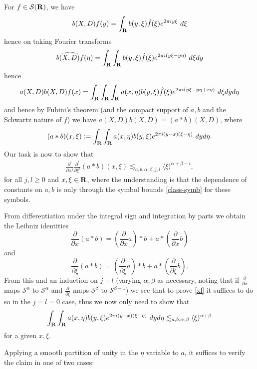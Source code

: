 \documentclass[11pt]{article}
\theoremstyle{definition}
\theoremstyle{remark}
\begin{document}
For \({f \in {\mathcal S}({\bf R})}\), we have 
\[\displaystyle  b(X,D) f(y) = \int_{\bf R} b(y,\xi) \hat f(\xi) e^{2\pi i y \xi}\ d\xi\]
 hence on taking Fourier transforms 
\[\displaystyle  \widehat{b(X,D) f}(\eta) = \int_{\bf R} \int_{\bf R} b(y,\xi) \hat f(\xi) e^{2\pi i (y \xi- y\eta)}\ d\xi dy\]
 hence 
\[\displaystyle  a(X,D) b(X,D) f(x) = \int_{\bf R} \int_{\bf R} \int_{\bf R} a(x,\eta) b(y,\xi) \hat f(\xi) e^{2\pi i (y \xi-y\eta + x \eta)}\ d\xi dy d\eta\]
 and hence by Fubini’s theorem (and the compact support of \({a,b}\) and the Schwartz nature of \({f}\)) we have \({a(X,D) b(X,D) = (a \ast b)(X,D)}\), where 
\begin{align}\label{ast-def}
  (a \ast b)(x,\xi) := \int_{\bf R} \int_{\bf R} a(x,\eta) b(y,\xi) e^{2\pi i (y-x)(\xi-\eta)}\ dy d\eta. 
\end{align}
 Our task is now to show that 
\begin{align}\label{xl}
  \frac{\partial^j}{\partial x^j} \frac{\partial^l}{\partial \xi^l} (a \ast b)(x,\xi) \lesssim_{a,b,\alpha,\beta,j,l} \langle \xi \rangle^{\alpha+\beta-l}, 
\end{align}
 for all \({j,l \geq 0}\) and \({x,\xi \in {\bf R}}\), where the understanding is that the dependence of constants on \({a,b}\) is only through the symbol bounds \eqref{class-symb} for these symbols.

From differentiation under the integral sign and integration by parts we obtain the Leibniz identities 
\[\displaystyle  \frac{\partial}{\partial x} (a \ast b) = (\frac{\partial}{\partial x} a) \ast b + a \ast (\frac{\partial}{\partial x} b)\]
 and 
\[\displaystyle  \frac{\partial}{\partial \xi} (a \ast b) = (\frac{\partial}{\partial \xi} a) \ast b + a \ast (\frac{\partial}{\partial \xi} b).\]
 From this and an induction on \({j+l}\) (varying \({\alpha,\beta}\) as necessary, noting that if \({\frac{\partial}{\partial x}}\) maps \({{\mathcal S}^\alpha}\) to \({{\mathcal S}^\alpha}\) and \({\frac{\partial}{\partial \xi}}\) maps \({{\mathcal S}^\beta}\) to \({{\mathcal S}^{\beta-1}}\)) we see that to prove \eqref{xl} it suffices to do so in the \({j=l=0}\) case, thus we now only need to show that 
\begin{align}\label{yo}
  \int_{\bf R} \int_{\bf R} a(x,\eta) b(y,\xi) e^{2\pi i (y-x)(\xi-\eta)}\ dy d\eta \lesssim_{a,b,\alpha,\beta} \langle \xi \rangle^{\alpha+\beta} 
\end{align}
 for a given \({x,\xi}\).

Applying a smooth partition of unity in the \({\eta}\) variable to \({a}\), it suffices to verify the claim in one of two cases: 
\end{document}
